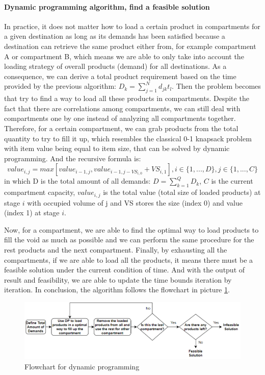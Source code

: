\documentclass{article}
\begin{document}
\paragraph{Dynamic programming algorithm, find a feasible solution}
In practice, it does not matter how to load a certain product in compartments for a given destination as long as its demands has been satisfied because a destination can retrieve the same product either from, for example compartment A or compartment  B, which means we are able to only take into account the loading strategy of overall products (demand) for all destinations. As a consequence, we can derive a total product requirement based on the time provided by the previous algorithm: $D_k={\sum_{j=1}^{N}}d_{jk}t_l$. Then the problem becomes that try to find a way to load all these products in compartments. Despite the fact that there are correlations among compartments, we can still deal with compartments one by one instead of analyzing all compartments together. Therefore, for a certain compartment, we can grab products from the total quantity to try to fill it up, which resembles the classical 0-1 knapsack problem with item value being equal to item size, that can be solved by dynamic programming. And the recursive formula is:
\begin{equation}
value_{i,j} = max [value_{i-1,j}, value_{i-1,j-VS_{i,0}}+VS_{i,1}], i\in\{1,...,D\}, j\in\{1,...,C\}
\end{equation}
in which D is the total amount of all demands: $D={\sum_{k=1}^{Q}}D_k$, $C$ is the current compartment capacity, $value_{i,j}$ is the total value (total size of loaded products) at stage $i$ with occupied volume of j and VS stores the size (index 0) and value (index 1) at stage $i$. 

Now, for a compartment, we are able to find the optimal way to load products to fill the void as much as possible and we can perform the same procedure for the rest products and the next compartment. Finally, by exhausting all the compartments, if we are able to load all the products, it means there must be a feasible solution under the current condition of time. And with the output of result and feasibility, we are able to update the time bounds iteration by iteration. In conclusion, the algorithm follows the flowchart in picture \ref{fig:flowchartDP}.

\begin{figure}[ht]
    \centering
    \includegraphics[scale=0.8]{flowchartDP.png}
    \caption{Flowchart for dynamic programming}
    \label{fig:flowchartDP}
\end{figure}
\end{document}
